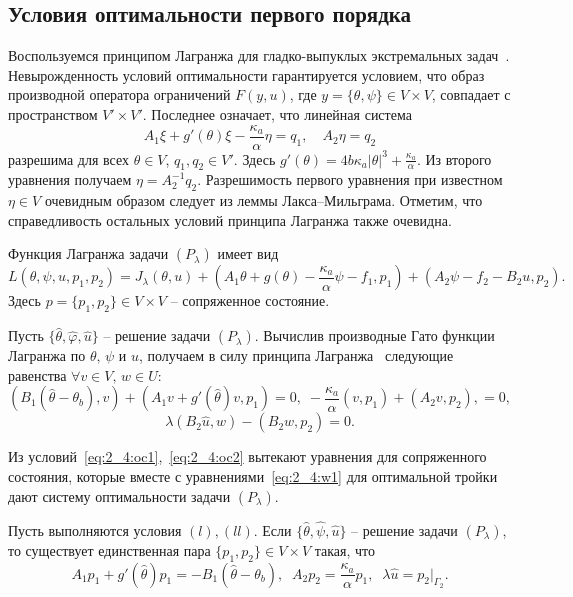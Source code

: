 \subsection{Условия оптимальности первого порядка}
\label{subsec:ch2/sec4/optimality}

Воспользуемся принципом Лагранжа для
гладко-выпуклых экстремальных задач~\cite{11,10}.
Невырожденность условий оптимальности гарантируется условием, что образ
производной оператора ограничений $F(y, u)$, где $y=\{\theta, \psi\} \in V\times V$,
совпадает с пространством $V' \times V'$.
Последнее означает, что линейная система
\[
    A_1\xi + g'(\theta)\xi - \frac{\kappa_a}{\alpha}\eta = q_1, \quad
    A_2\eta = q_2
\]
разрешима для всех $\theta\in V$, $q_1,q_2\in V'$.
Здесь $g'(\theta)=4b\kappa_a|\theta|^3+\frac{\kappa_a}{\alpha}$.
Из второго уравнения получаем $\eta = A_2^{-1}q_2$.
Разрешимость первого уравнения при известном $\eta\in V$
очевидным образом следует из леммы Лакса--Мильграма.
Отметим, что справедливость остальных условий принципа Лагранжа также очевидна.

Функция Лагранжа задачи $(P_\lambda)$
имеет вид
\[
    L (\theta, \psi, u, p_1, p_2) = J_\lambda(\theta, u)
    + \left( A_1 \theta + g (\theta)
    - \frac{\kappa_a}{\alpha}\psi - f_1, p_1 \right)
    + (A_2 \psi - f_2 - B_2 u, p_2).
\]
Здесь $p=\{p_1,p_2\} \in V \times V$ -- сопряженное состояние.

Пусть $\{\hat{\theta}, \hat{\varphi}, \hat{u} \}$ -- решение задачи $(P_\lambda)$.
Вычислив производные Гато функции Лагранжа по $\theta,\,\psi$ и $u$, получаем
в силу принципа Лагранжа~\cite[Гл. 2, теорема 1.5]{10} следующие равенства
$\forall v\in V,\, w \in U$:
\begin{equation}
    \label{eq:2_4:oc1}
    (B_1(\hat{\theta} -\theta_b), v) + (A_1 v + g'(\hat{\theta})v, p_1)=0,\;
    -\frac{\kappa_a}{\alpha}(v ,p_1)+ (A_2 v,p_2), = 0,
\end{equation}
\begin{equation}
    \label{eq:2_4:oc2}
    \lambda(B_2\hat{u},w) - (B_2 w, p_2) = 0.
\end{equation}

Из условий~\eqref{eq:2_4:oc1},~\eqref{eq:2_4:oc2}
вытекают уравнения для сопряженного состояния,
которые вместе с уравнениями~\eqref{eq:2_4:w1}
для оптимальной тройки дают систему оптимальности задачи $(P_\lambda)$.

\begin{theorem}
    Пусть выполняются условия $(l), (ll)$.
    Если $\{\hat{\theta}, \hat{\psi}, \hat{u}\}$ -- решение
    задачи $(P_\lambda)$, то существует единственная пара
    $\{p_1, p_2 \} \in V\times V$ такая, что
    \begin{equation}
        \label{eq:2_4:as}
        A_1 p_1+g'(\hat{\theta}) p_1=-B_1(\hat{\theta} -\theta_b),\;\;
        A_2 p_2=\frac{\kappa_a}{\alpha}p_1,\;\;
        \lambda\hat{u}=p_2|_{\Gamma_2}.
    \end{equation}
\end{theorem}

